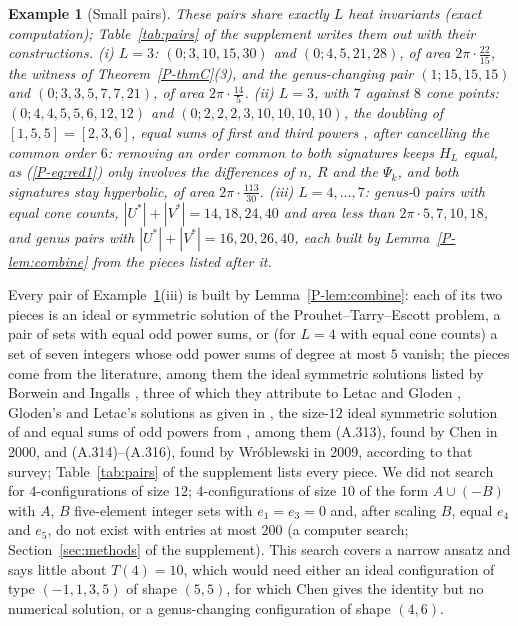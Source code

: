\documentclass[pdflatex,sn-mathphys-num]{sn-jnl}
\newcommand{\pref}[1]{\ref*{P-#1}}%
\theoremstyle{thmstyleone}%
\theoremstyle{thmstylethree}%
\newtheorem{example}[proposition]{Example}%
\begin{document}
\begin{example}[Small pairs]\label{ex:ptepairs}
These pairs share exactly $L$ heat invariants (exact computation); Table~\ref{tab:pairs} of the supplement writes them out with their constructions. (i) $L=3$: $(0;3,10,15,30)$ and $(0;4,5,21,28)$, of area $2\pi\cdot\frac{22}{15}$, the witness of Theorem~\pref{thmC}(3), and the genus-changing pair $(1;15,15,15)$ and $(0;3,3,5,7,7,21)$, of area $2\pi\cdot\frac{14}5$. (ii) $L=3$, with $7$ against $8$ cone points: $(0;4,4,5,5,6,12,12)$ and $(0;2,2,2,3,10,10,10,10)$, the doubling of $[1,5,5]=[2,3,6]$, equal sums of first and third powers \cite[A.1.6]{chen2025survey}, after cancelling the common order $6$: removing an order common to both signatures keeps $H_L$ equal, as (\pref{eq:red1}) only involves the differences of $n$, $R$ and the $\Psi_k$, and both signatures stay hyperbolic, of area $2\pi\cdot\frac{113}{30}$. (iii) $L=4,\dots,7$: genus-$0$ pairs with equal cone counts, $|U^*|+|V^*|=14,18,24,40$ and area less than $2\pi\cdot5,7,10,18$, and genus pairs with $|U^*|+|V^*|=16,20,26,40$, each built by Lemma~\pref{lem:combine} from the pieces listed after it.
\end{example}

Every pair of Example~\ref{ex:ptepairs}(iii) is built by Lemma~\pref{lem:combine}: each of its two pieces is an ideal or symmetric solution of the Prouhet--Tarry--Escott problem, a pair of sets with equal odd power sums, or (for $L=4$ with equal cone counts) a set of seven integers whose odd power sums of degree at most $5$ vanish; the pieces come from the literature, among them the ideal symmetric solutions listed by Borwein and Ingalls \cite[pp.~9, 25]{borweiningalls1994}, three of which they attribute to Letac and Gloden \cite[p.~10]{borweiningalls1994}, Gloden's and Letac's solutions as given in \cite[pp.~2064, 2069]{blp2003}, the size-$12$ ideal symmetric solution of \cite[(5)]{cmsv2024} and equal sums of odd powers from \cite[A.1.17, A.1.26, A.1.33]{chen2025survey}, among them (A.313), found by Chen in 2000, and (A.314)--(A.316), found by Wr\'oblewski in 2009, according to that survey; Table~\ref{tab:pairs} of the supplement lists every piece. We did not search for $4$-configurations of size $12$; $4$-configurations of size $10$ of the form $A\cup(-B)$ with $A$, $B$ five-element integer sets with $e_1=e_3=0$ and, after scaling $B$, equal $e_4$ and $e_5$, do not exist with entries at most $200$ (a computer search; Section~\ref{sec:methods} of the supplement). This search covers a narrow ansatz and says little about $T(4)=10$, which would need either an ideal configuration of type $(-1,1,3,5)$ of shape $(5,5)$, for which Chen gives the identity \cite[(3.33)]{chen2025survey} but no numerical solution, or a genus-changing configuration of shape $(4,6)$.
\end{document}
